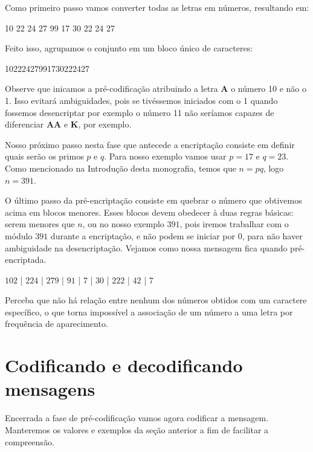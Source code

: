 Como primeiro passo vamos converter todas as letras em n\'umeros, resultando em:
 
\begin{center}
10 22 24 27 99 17 30 22 24 27
\end{center}

Feito isso, agrupamos o conjunto em um bloco \'unico de caracteres:

\begin{center}
10222427991730222427
\end{center}

Observe que inicamos a pr\'e-codifica\c{c}\~ao atribuindo a letra \textbf{A} o n\'umero 10 e n\~ao o 1. Isso evitar\'a ambiguidades, pois se tiv\'essemos iniciados com o 1 quando fossemos desencriptar por exemplo o n\'umero 11 n\~ao ser\'iamos capazes de diferenciar \textbf{AA} e \textbf{K}, por exemplo.

Nosso pr\'oximo passo nesta fase que antecede a encripta\c{c}\~ao consiste em definir quais ser\~ao os primos $p$ e $q$. Para nosso exemplo vamos usar $p=17$ e $q=23$. Como mencionado na Introdu\c{c}\~ao desta monografia, temos que $n = pq$, logo $n=391$.

O \'ultimo passo da pr\'e-encripta\c{c}\~ao consiste em quebrar o n\'umero que obtivemos acima em blocos menores. Esses blocos devem obedecer \`a duas regras b\'asicas: serem menores que $n$, ou no nosso exemplo $391$, pois iremos trabalhar com  o m\'odulo $391$ durante a encripta\c{c}\~ao, e n\~ao podem se iniciar por $0$, para n\~ao haver ambiguidade na desencripta\c{c}\~ao. Vejamos como nossa mensagem fica quando pr\'e-encriptada.

\begin{center}
$102$ | $224$ | $279$ | $91$ | $7$ | $30$ | $222$ | $42$ | $7$
\end{center}

Perceba que n\~ao h\'a rela\c{c}\~ao entre nenhum dos n\'umeros obtidos com um caractere espec\'ifico, o que torna imposs\'ivel a associa\c{c}\~ao de um n\'umero a uma letra por frequ\^encia de aparecimento. 

\section{Codificando e decodificando mensagens}

Encerrada a fase de pr\'e-codifica\c{c}\~ao vamos agora codificar a mensagem. Manteremos os valores e exemplos da se\c{c}\~ao anterior a fim de facilitar a compreens\~ao.

